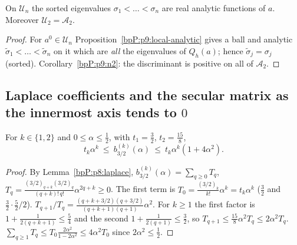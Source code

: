 \begin{lemma}\label{bpP:p10:sorted-analytic}
On $\mathcal U_n$ the sorted eigenvalues $\sigma_1<\dots<\sigma_n$ are real analytic functions of $a$. Moreover $\mathcal U_2=\mathcal A_2$.
\end{lemma}
\begin{proof}
\label{stepP:p10:sa-loc} For $a^0\in\mathcal U_n$ Proposition~\ref{bpP:p9:local-analytic} gives a ball and analytic $\tilde\sigma_1<\dots<\tilde\sigma_n$ on it which are \emph{all} the eigenvalues of $Q_h(a)$; hence $\tilde\sigma_j=\sigma_j$ (sorted). \label{stepP:p10:sa-n2} Corollary~\ref{bpP:p9:n2}: the discriminant is positive on all of $\mathcal A_2$.
\end{proof}

\subsection{Laplace coefficients and the secular matrix as the innermost axis tends to $0$}\label{bpP:p10:sec-asym}

\begin{lemma}\label{bpP:p10:laplace-bounds}
For $k\in\{1,2\}$ and $0\le\alpha\le\tfrac12$, with $t_1=\tfrac32$, $t_2=\tfrac{15}8$,
\[t_k\alpha^k\ \le\ b_{3/2}^{(k)}(\alpha)\ \le\ t_k\alpha^k(1+4\alpha^2).\]
\end{lemma}
\begin{proof}
\label{stepP:p10:lb-series} By Lemma~\ref{bpP:p8:laplace}, $b_{3/2}^{(k)}(\alpha)=\sum_{q\ge0}T_q$, $T_q=\frac{(3/2)_{q+k}(3/2)_q}{(q+k)!\,q!}\alpha^{2q+k}\ge0$. The first term is $T_0=\frac{(3/2)_k}{k!}\alpha^k=t_k\alpha^k$ ($\tfrac32$ and $\tfrac32\cdot\tfrac52/2$).
\label{stepP:p10:lb-ratio} $T_{q+1}/T_q=\frac{(q+k+3/2)(q+3/2)}{(q+k+1)(q+1)}\alpha^2$. For $k\ge1$ the first factor is $1+\frac1{2(q+k+1)}\le\frac54$ and the second $1+\frac1{2(q+1)}\le\frac32$, so $T_{q+1}\le\frac{15}8\alpha^2T_q\le2\alpha^2T_q$.
\label{stepP:p10:lb-tail} $\sum_{q\ge1}T_q\le T_0\frac{2\alpha^2}{1-2\alpha^2}\le4\alpha^2T_0$ since $2\alpha^2\le\frac12$.
\end{proof}

